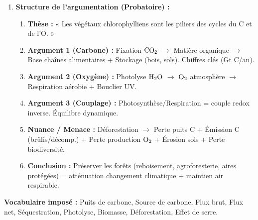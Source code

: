 \documentclass[11pt]{article}
\newcommand{\cle}[1]{{\popxbold\color{popdark}#1}}
\begin{document}
\begin{methode}
\begin{enumerate}
\begin{itemize}
            \end{itemize}
        \item \textbf{Structure de l'argumentation (Probatoire) :}
            \begin{enumerate}
                \item \textbf{Thèse :} « Les végétaux chlorophylliens sont les piliers des cycles du C et de l'O. »
                \item \textbf{Argument 1 (Carbone) :} Fixation $\ce{CO2}$ $\rightarrow$ Matière organique $\rightarrow$ Base chaînes alimentaires + Stockage (bois, sols). Chiffres clés (Gt C/an).
                \item \textbf{Argument 2 (Oxygène) :} Photolyse $\ce{H2O}$ $\rightarrow$ $\ce{O2}$ atmosphère $\rightarrow$ Respiration aérobie + Bouclier UV.
                \item \textbf{Argument 3 (Couplage) :} Photosynthèse/Respiration = couple redox inverse. Équilibre dynamique.
                \item \textbf{Nuance / Menace :} Déforestation $\rightarrow$ Perte puits C + Émission C (brûlis/décomp.) + Perte production $\ce{O2}$ + Érosion sols + Perte biodiversité.
                \item \textbf{Conclusion :} Préserver les forêts (reboisement, agroforesterie, aires protégées) = atténuation changement climatique + maintien air respirable.
            \end{enumerate}
    \end{enumerate}
    \textbf{Vocabulaire imposé :} \cle{Puits de carbone}, \cle{Source de carbone}, \cle{Flux brut}, \cle{Flux net}, \cle{Séquestration}, \cle{Photolyse}, \cle{Biomasse}, \cle{Déforestation}, \cle{Effet de serre}.
\end{methode}
\end{document}
